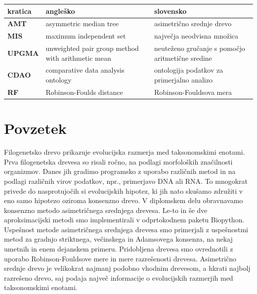 \documentclass[a4paper, 12pt]{book}
\newcommand{\clearemptydoublepage}{\newpage{\pagestyle{empty}\cleardoublepage}}
\begin{document}
\begin{tabular}{l|p{6cm}|p{6cm}}
  {\bf kratica} & {\bf angleško} & {\bf slovensko} \\ \hline
  {\bf AMT} & asymmetric median tree & asimetrično srednje drevo \\
  {\bf MIS} & maximum independent set & največja neodvisna množica \\
  {\bf UPGMA} & unweighted pair group method with arithmetic mean & neuteženo gručanje s pomočjo aritmetične sredine \\
  {\bf CDAO} & comparative data analysis ontology  & ontologija podatkov za primerjalno analizo \\
  {\bf RF} & Robinson-Foulds distance & Robinson-Fouldsova mera \\
\end{tabular}



\clearemptydoublepage

\chapter*{Povzetek}

Filogenetsko drevo prikazuje evolucijska razmerja med taksonomskimi
enotami. Prva filogenetska drevesa so risali ročno, na podlagi morfoloških
zna\-čil\-nos\-ti organizmov. Danes jih gradimo programsko z uporabo različnih
metod in na podlagi različnih virov podatkov, npr., primerjavo DNA ali RNA.
To mnogokrat privede do nasprotujočih si evolucijskih hipotez, ki jih nato
skušamo združiti v eno samo hipotezo oziroma konsenzno drevo. V diplomskem
delu obravnavamo konsenzno metodo asimetričnega srednjega drevesa. Le-to in
še dve aproksimacijski metodi smo implementirali v odprtokodnem paketu
Biopython. Uspešnost metode asimetričnega srednjega drevesa smo primerjali
z uspešnostmi metod za gradnjo striktnega, večinskega in Adamsovega
konsenza, na nekaj umetnih in enem dejanskem primeru. Pridobljena drevesa
smo ovrednotili z uporabo Robinson-Fouldsove mere in mere razrešenosti
drevesa. Asimetrično srednje drevo je velikokrat najmanj podobno vhodnim
drevesom, a hkrati najbolj razrešeno drevo, saj podaja največ informacije o
evolucijskih razmerjih med taksonomskimi enotami.

\bigskip
\end{document}
